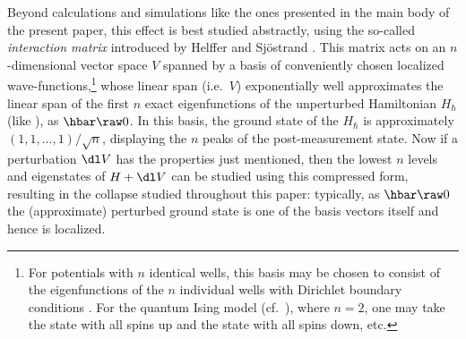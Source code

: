 \documentclass[12pt]{article}
\begin{document}
Beyond calculations and simulations like the ones presented in the main body of the present paper, this effect is best studied abstractly, using the so-called \emph{interaction matrix} introduced by Helffer and Sj\"{o}strand \cite{Helffer,HS,Simon4}. 
This matrix acts on an $n$-dimensional vector space $V$ spanned by a basis of conveniently chosen 
localized wave-functions,\footnote{For potentials with $n$ identical wells, this basis may be chosen to consist of the eigenfunctions of the $n$ individual wells with Dirichlet boundary conditions  \cite{Helffer,HS}. For the quantum Ising model (cf.\ \cite{KT}), where $n=2$, one may take the state with all spins up and the state with all spins down, etc.}  whose linear span (i.e.\ $V$) exponentially well approximates the linear span of the first $n$
 exact eigenfunctions of  the unperturbed Hamiltonian $H_{\hbar}$ (like  ), 
 as $\hbar\raw 0$. 
In this basis, the ground state of the  $H_{\hbar}$ is approximately $(1,1,\ldots,1)/\sqrt{n}$, displaying the $n$ peaks of the post-measurement state. 
Now if a perturbation $\dl V$ has the properties just mentioned, then the lowest $n$ levels and eigenstates of $H+\dl V$ can be studied using this compressed form, resulting in the collapse studied throughout this paper: typically,  as $\hbar\raw 0$  the (approximate) perturbed ground state
is one of the basis vectors itself  and hence is localized. 
\end{document}
